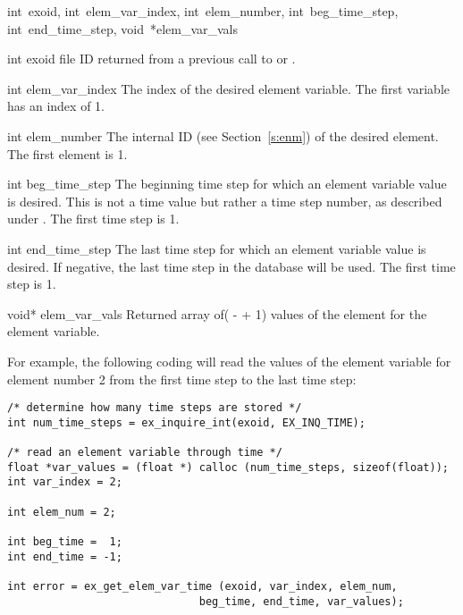 {int~exoid, 
int~elem_var_index, 
int~elem_number, 
int~beg_time_step, 
int~end_time_step, 
void~*elem_var_vals}

\begin{parameters}
\item[{int exoid \R{}}]
\exo{} file ID returned from a previous call to  
or .

\item[{int elem_var_index \R{}}]
The index of the desired element variable. The first variable has an
index of 1.

\item[{int elem_number \R{}}]
The internal ID (see Section~\ref{s:enm}) of the desired
element. The first element is 1.

\item[{int beg_time_step \R{}}]
The beginning time step for which an element variable value is
desired. This is not a time value but rather a time step number, as
described under . The first time step is 1.

\item[{int end_time_step \R{}}]
The last time step for which an element variable value is desired. If
negative, the last time step in the database will be used. The first
time step is 1.

\item[{void* elem_var_vals \W{}}]
Returned array of( {-}  + 
1) values of the \th{} element for the \th{} 
element variable.
\end{parameters}

For example, the following coding will read the values of the
\th{} element variable for element number 2 from the first
time step to the last time step:

\begin{lstlisting}
/* determine how many time steps are stored */
int num_time_steps = ex_inquire_int(exoid, EX_INQ_TIME);

/* read an element variable through time */
float *var_values = (float *) calloc (num_time_steps, sizeof(float));
int var_index = 2;

int elem_num = 2;

int beg_time =  1;
int end_time = -1;

int error = ex_get_elem_var_time (exoid, var_index, elem_num, 
                              beg_time, end_time, var_values);
\end{lstlisting}

